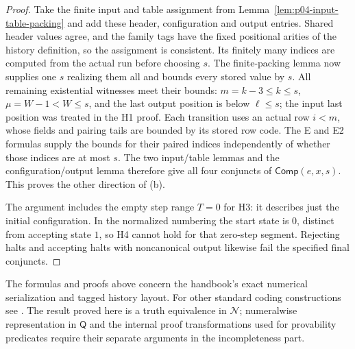 \begin{proof}
Take the finite input and table assignment from
Lemma~\ref{lem:p04-input-table-packing} and add these header,
configuration and output entries.  Shared header values agree,
and the family tags have the fixed positional arities of the
history definition, so the assignment is consistent.  Its
finitely many indices are computed from the actual run before
choosing \(s\).  The finite-packing lemma now supplies one \(s\)
realizing them all and bounds every stored value by \(s\).
All remaining existential witnesses meet their bounds:
\(m=k-3\leq k\leq s\), \(\mu=W-1<W\leq s\), and
the last output position is below \(\ell\leq s\);
the input last position was treated in the H1 proof.
Each transition uses an actual row \(i<m\), whose fields and
pairing tails are bounded by its stored row code.  The E and E2
formulas supply the bounds for their paired indices independently
of whether those indices are at most \(s\).
The two input/table lemmas and the configuration/output lemma
therefore give all four conjuncts of \(\mathsf{Comp}(e,x,s)\).
This proves the other direction of (b).

The argument includes the empty step range \(T=0\) for H3:
it describes just the initial configuration.  In the normalized
numbering the start state is \(0\), distinct from accepting state
\(1\), so H4 cannot hold for that zero-step segment.  Rejecting
halts and accepting halts with noncanonical output likewise fail
the specified final conjuncts.
\end{proof}

The formulas and proofs above concern the handbook's exact numerical
serialization and tagged history layout.  For other standard coding
constructions see \cite{Shoenfield1967,BoolosBurgessJeffrey2007}.
The result proved here is a truth equivalence in \(\mathcal N\);
numeralwise representation in \(\mathsf Q\) and the internal
proof transformations used for provability predicates require their
separate arguments in the incompleteness part.


